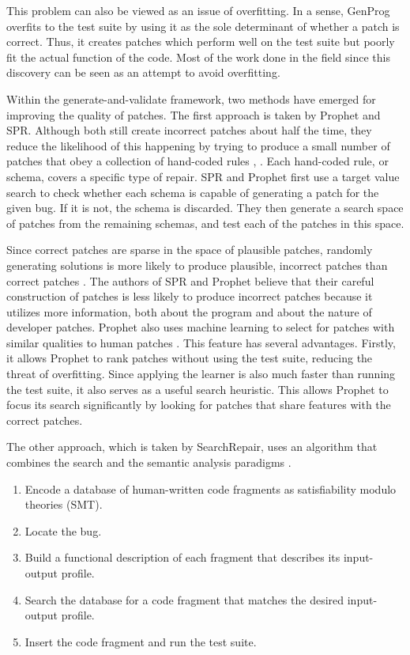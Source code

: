 \documentclass[conference]{IEEEtran}
\begin{document}
This problem can also be viewed as an issue of overfitting. 
In a sense, GenProg overfits to the test suite by using it as the sole determinant of whether a patch is correct. 
Thus, it creates patches which perform well on the test suite but poorly fit the actual function of the code. 
Most of the work done in the field since this discovery can be seen as an attempt to avoid overfitting.

Within the generate-and-validate framework, two methods have emerged for improving the quality of patches. 
The first approach is taken by Prophet and SPR. Although both still create incorrect patches about half the time, they reduce the likelihood of this happening by trying to produce a small number of patches that obey a collection of hand-coded rules \cite{SPR}, \cite{Prophet}. 
Each hand-coded rule, or schema, covers a specific type of repair. SPR and Prophet first use a target value search to check whether each schema is capable of generating a patch for the given bug. 
If it is not, the schema is discarded. 
They then generate a search space of patches from the remaining schemas, and test each of the patches in this space.

Since correct patches are sparse in the space of plausible patches, randomly generating solutions is more likely to produce plausible, incorrect patches than correct patches \cite{searchspace}.  
The authors of SPR and Prophet believe that their careful construction of patches is less likely to produce incorrect patches because it utilizes more information, both about the program and about the nature of developer patches.  
Prophet also uses machine learning to select for patches with similar qualities to human patches \cite{Prophet}. 
This feature has several advantages. 
Firstly, it allows Prophet to rank patches without using the test suite, reducing the threat of overfitting. 
Since applying the learner is also much faster than running the test suite, it also serves as a useful search heuristic. 
This allows Prophet to focus its search significantly by looking for patches that share features with the correct patches. 

The other approach, which is taken by SearchRepair, uses an algorithm that combines the search and the semantic analysis paradigms \cite{SearchRepair}. 
\begin{enumerate}
\item Encode a database of human-written code fragments as satisfiability modulo theories (SMT).
\item Locate the bug.
\item Build a functional description of each fragment that describes its input-output profile.
\item Search the database for a code fragment that matches the desired input-output profile.
\item Insert the code fragment and run the test suite.
\end{enumerate}
\end{document}

